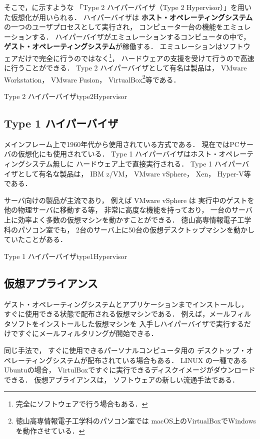 そこで，に示すような
「Type 2 ハイパーバイザ（Type 2 Hypervisor）」を用いた仮想化が用いられる．
ハイパーバイザは
{\bf ホスト・オペレーティングシステム}の一つのユーザプロセスとして実行され，
コンピュータ一台の機能をエミュレーションする．
ハイパーバイザがエミュレーションするコンピュータの中で，
{\bf ゲスト・オペレーティングシステム}が稼働する．
エミュレーションはソフトウェアだけで完全に行うのではなく\footnote{
完全にソフトウェアで行う場合もある．}，
ハードウェアの支援を受けて行うので高速に行うことができる\cite{virtualization}．
Type 2 ハイパーバイザとして有名は製品は，
VMware Workstation，
VMware Fusion，
VirtualBox\footnote{
徳山高専情報電子工学科のパソコン室では
macOS上のVirtualBoxでWindowsを動作させている．
}等である．

{Type 2 ハイパーバイザ}{type2Hypervisor}

\subsection{Type 1 ハイパーバイザ}
メインフレーム上で1960年代から使用されている方式である．
現在ではPCサーバの仮想化にも使用されている．
Type 1 ハイパーバイザはホスト・オペレーティングシステム無しに
ハードウェア上で直接実行される．
Type 1 ハイパーバイザとして有名な製品は，
IBM z/VM，
VMware vSphere，
Xen，
Hyper-V等である．

サーバ向けの製品が主流であり，
例えば VMware vSphere は
実行中のゲストを他の物理サーバに移動する等，
非常に高度な機能を持っており\cite{vsphere}，
一台のサーバ上に効率よく多数の仮想マシンを動かすことができる．
徳山高専情報電子工学科のパソコン室でも，
2台のサーバ上に50台の仮想デスクトップマシンを動かしていたことがある．

{Type 1 ハイパーバイザ}{type1Hypervisor}

\subsection{仮想アプライアンス}
ゲスト・オペレーティングシステムとアプリケーションまでインストールし，
すぐに使用できる状態で配布される仮想マシンである．
例えば，メールフィルタソフトをインストールした仮想マシンを
入手しハイパーバイザで実行するだけですぐにメールフィルタリングが開始できる．

同じ手法で，
すぐに使用できるパーソナルコンピュータ用の
デスクトップ・オペレーティングシステムが配布されている場合もある．
LINUX の一種であるUbuntuの場合，
VirtulBoxですぐに実行できるディスクイメージがダウンロードできる\cite{ubuntu}．
仮想アプライアンスは，
ソフトウェアの新しい流通手法である．

